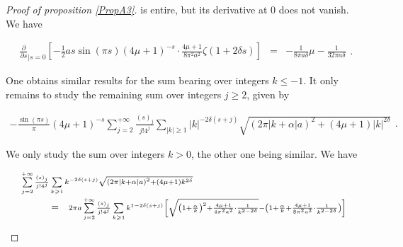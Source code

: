 \documentclass{jams-l}
\theoremstyle{definition}
\theoremstyle{remark}
\numberwithin{equation}{section}
\begin{document}
\begin{proof}[Proof of proposition \ref{PropA3}]
                \noindent is entire, but its derivative at $0$ does not vanish. We have
                
                \[ \begin{array}{lll}
                        \frac{\partial}{\partial s}_{\left \vert s = 0 \right.} \left[ - \frac{1}{2} a s \sin \left( \pi s \right) \left( 4 \mu + 1 \right)^{-s} \cdot \frac{4 \mu + 1}{8 \pi^2 a ^2} \zeta \left( 1 + 2 \delta s \right) \right] & = & - \frac{1}{8 \pi a \delta} \mu - \frac{1}{32 \pi a \delta}
                    \end{array} . \]
                
                \noindent One obtains similar results for the sum bearing over integers $k \leqslant -1$. It only remains to study the remaining sum over integers $j \geqslant 2$, given by
                
                \[ \begin{array}{l}
                        - \frac{\sin \left( \pi s \right)}{\pi} \left( 4 \mu + 1 \right)^{-s} \sum\limits_{j = 2}^{+ \infty} \frac{\left( s \right)_j}{j! 4^{j}} \sum\limits_{\left \vert k \right \vert \geqslant 1} \left \vert k \right \vert^{-2 \delta \left( s + j \right)} \sqrt{\left( 2 \pi \left \vert k + \alpha \right \vert a \right)^2 + \left( 4 \mu + 1 \right) \left \vert k \right \vert^{2 \delta}}
                    \end{array} . \]
                
                \noindent We only study the sum over integers $k > 0$, the other one being similar. We have
                
                \[ \begin{array}{lll}
                        \multicolumn{3}{l}{\scriptstyle \sum\limits_{j = 2}^{+ \infty} \frac{\left( s \right)_j}{j! 4^{j}} \sum\limits_{k \geqslant 1} k^{-2 \delta \left( s + j \right)} \sqrt{\left( 2 \pi \left \vert k + \alpha \right \vert a \right)^2 + \left( 4 \mu + 1 \right) k^{2 \delta}}} \\[1em]
                        
                        \qquad & = & \scriptstyle 2 \pi a \sum\limits_{j = 2}^{+ \infty} \frac{\left( s \right)_j}{j! 4^{j}} \sum\limits_{k \geqslant 1} k^{1 - 2 \delta \left( s + j \right)} \left[ \sqrt{ \left( 1 + \frac{\alpha}{k} \right)^2 + \frac{4 \mu + 1}{4 \pi^2 a^2} \cdot \frac{1}{k^{2-2\delta}}} - \left( 1 + \frac{\alpha}{k} + \frac{4 \mu + 1}{8 \pi^2 a^2} \cdot \frac{1}{k^{2-2\delta}} \right) \right] \\[1em]
                        

\end{array}\]
\end{proof}
\end{document}
